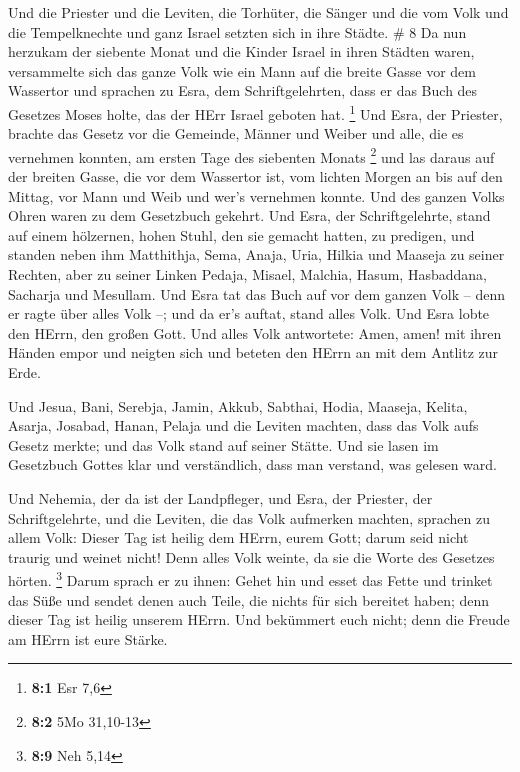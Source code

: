  Und die Priester und die Leviten, die Torhüter, die Sänger
und die vom Volk und die Tempelknechte und ganz Israel setzten sich in
ihre Städte. \# 8  Da nun herzukam der siebente Monat und
die Kinder Israel in ihren Städten waren, versammelte sich das ganze
Volk wie ein Mann auf die breite Gasse vor dem Wassertor und sprachen zu
Esra, dem Schriftgelehrten, dass er das Buch des Gesetzes Moses holte,
das der HErr Israel geboten hat. \footnote{\textbf{8:1} Esr 7,6}
 Und Esra, der Priester, brachte das Gesetz vor die
Gemeinde, Männer und Weiber und alle, die es vernehmen konnten, am
ersten Tage des siebenten Monats \footnote{\textbf{8:2} 5Mo 31,10-13}
 und las daraus auf der breiten Gasse, die vor dem Wassertor
ist, vom lichten Morgen an bis auf den Mittag, vor Mann und Weib und
wer's vernehmen konnte. Und des ganzen Volks Ohren waren zu dem
Gesetzbuch gekehrt.  Und Esra, der Schriftgelehrte, stand
auf einem hölzernen, hohen Stuhl, den sie gemacht hatten, zu predigen,
und standen neben ihm Matthithja, Sema, Anaja, Uria, Hilkia und Maaseja
zu seiner Rechten, aber zu seiner Linken Pedaja, Misael, Malchia, Hasum,
Hasbaddana, Sacharja und Mesullam.  Und Esra tat das Buch
auf vor dem ganzen Volk -- denn er ragte über alles Volk --; und da er's
auftat, stand alles Volk.  Und Esra lobte den HErrn, den
großen Gott. Und alles Volk antwortete: Amen, amen! mit ihren Händen
empor und neigten sich und beteten den HErrn an mit dem Antlitz zur
Erde.

 Und Jesua, Bani, Serebja, Jamin, Akkub, Sabthai, Hodia,
Maaseja, Kelita, Asarja, Josabad, Hanan, Pelaja und die Leviten machten,
dass das Volk aufs Gesetz merkte; und das Volk stand auf seiner Stätte.
 Und sie lasen im Gesetzbuch Gottes klar und verständlich,
dass man verstand, was gelesen ward.

 Und Nehemia, der da ist der Landpfleger, und Esra, der
Priester, der Schriftgelehrte, und die Leviten, die das Volk aufmerken
machten, sprachen zu allem Volk: Dieser Tag ist heilig dem HErrn, eurem
Gott; darum seid nicht traurig und weinet nicht! Denn alles Volk weinte,
da sie die Worte des Gesetzes hörten. \footnote{\textbf{8:9} Neh 5,14}
 Darum sprach er zu ihnen: Gehet hin und esset das Fette
und trinket das Süße und sendet denen auch Teile, die nichts für sich
bereitet haben; denn dieser Tag ist heilig unserem HErrn. Und bekümmert
euch nicht; denn die Freude am HErrn ist eure Stärke.

